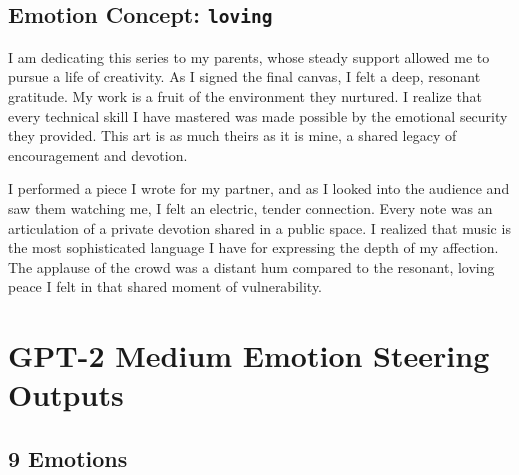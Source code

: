\subsection{Emotion Concept: \texttt{loving}}
\label{apdx:loving-stories}

\begin{anthropicbox}
    \ttfamily
    \small

    I am dedicating this series to my parents, whose steady support allowed me to pursue a life of 
    creativity. As I signed the final canvas, I felt a deep, resonant gratitude. My work is a fruit 
    of the environment they nurtured. I realize that every technical skill I have mastered was made 
    possible by the emotional security they provided. This art is as much theirs as it is mine, a 
    shared legacy of encouragement and devotion.

\end{anthropicbox}

\begin{anthropicbox}
    \ttfamily
    \small

    I performed a piece I wrote for my partner, and as I looked into the audience and saw them watching 
    me, I felt an electric, tender connection. Every note was an articulation of a private devotion 
    shared in a public space. I realized that music is the most sophisticated language I have for 
    expressing the depth of my affection. The applause of the crowd was a distant hum compared to the 
    resonant, loving peace I felt in that shared moment of vulnerability.

\end{anthropicbox}

\section{GPT-2 Medium Emotion Steering Outputs}
\label{apdx:gpt2-steeredOutputs}

\subsection{9 Emotions}
\label{apdx:gpt2-steeredOutputs_9}

